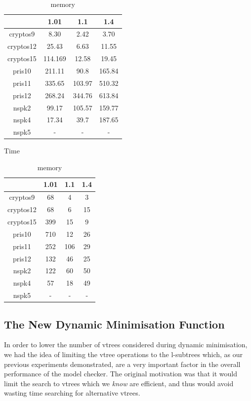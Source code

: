 \documentclass[11pt]{report}
\begin{document}
\begin{table}
\centering
\begin{tabular}{|*{4}{c|}}
\hline
 &1.01 & 1.1 & 1.4 \\ \hline
cryptos9 & 8.30 & 2.42 & 3.70 \\ \hline
cryptos12  & 25.43 & 6.63 & 11.55 \\ \hline
cryptos15 & 114.169 & 12.58 & 19.45 \\ \hline
pris10 & 211.11 & 90.8 &165.84  \\ \hline
pris11 & 335.65 & 103.97 & 510.32 \\ \hline
pris12 & 268.24 & 344.76 & 613.84\\ \hline
nspk2 & 99.17 & 105.57 & 159.77 \\ \hline
nspk4 & 17.34 & 39.7 & 187.65 \\ \hline
nspk5 & - & -&  -\\ \hline
\end{tabular}
\caption{Time}
\label{table:newconftime}
\vspace{1in}
\centering
\begin{tabular}{|*{4}{c|}}
\hline
 &1.01 & 1.1 & 1.4 \\ \hline
cryptos9 & 68 & 4 & 3 \\ \hline
cryptos12 & 68 &6 & 15 \\ \hline
cryptos15 & 399 &15& 9 \\ \hline
pris10 & 710 & 12 & 26 \\ \hline
pris11 & 252 & 106  &  29 \\ \hline
pris12 & 132 &46 & 25 \\ \hline
nspk2 & 122 & 60 & 50 \\ \hline
nspk4 & 57 & 18 & 49\\ \hline
nspk5 & - & - & -\\ \hline
\end{tabular}
\caption{memory}
\label{table:newconfmemory}
\end{table}



\subsection{The New Dynamic Minimisation Function}

In order to lower the number of vtrees considered during dynamic minimisation, we had the idea of limiting the vtree operations to the l-subtrees which, as our previous experiments demonstrated, are a very important factor in the overall performance of the model checker. The original motivation was that it would limit the search to vtrees which we \textit{know} are efficient, and thus would avoid wasting time searching for alternative vtrees.
\end{document}
